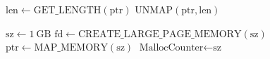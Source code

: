 \documentclass[11pt]{article}
\begin{document}
\begin{algorithm}
\begin{algorithmic}[1]
    \State $\text{len} \gets \text{GET\_LENGTH}(\text{ptr})$ 
    \State $\text{UNMAP}(\text{ptr}, \text{len})$ 
\EndFunction
\end{algorithmic}
\end{algorithm}

\begin{algorithm}
\begin{algorithmic}[1]
    \State $\text{sz} \gets 1\ \text{GB}$ 
    \State $\text{fd} \gets \text{CREATE\_LARGE\_PAGE\_MEMORY}(\text{sz})$ 
    \State $\text{ptr} \gets \text{MAP\_MEMORY}(\text{sz})$ 
    \State $\text{MallocCounter} \gets \text{sz}$ 
\EndFunction
\end{algorithmic}
\end{algorithm}



\end{document}

